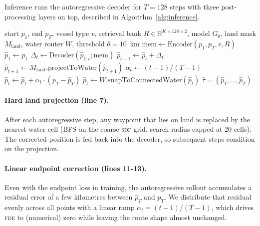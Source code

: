 \documentclass[oneside, a4paper, onecolumn, 11pt]{article}
\newcommand{\fde}{\textsc{fde}}
\newcommand{\sdf}{\textsc{sdf}}
\begin{document}
Inference runs the autoregressive decoder for $T = 128$ steps with
three post-processing layers on top, described in
Algorithm~\ref{alg:inference}.

\begin{algorithm}[h]
\caption{Inference: production routing.}
\label{alg:inference}
\begin{algorithmic}[1]
\REQUIRE start $p_1$, end $p_T$, vessel type $v$,
         retrieval bank $R \in \mathbb{R}^{K \times 128 \times 2}$,
         model $G_\theta$, land mask $M_{\mathrm{land}}$,
         water router $W$, threshold $\theta = 10$~km
\STATE $\mathrm{mem} \leftarrow \mathrm{Encoder}(p_1, p_T, v, R)$
\STATE $\hat p_1 \leftarrow p_1$
  \STATE $\Delta_t \leftarrow
          \mathrm{Decoder}(\hat p_{1:t}; \mathrm{mem})$
  \STATE $\hat p_{t+1} \leftarrow \hat p_t + \Delta_t$
    \STATE $\hat p_{t+1} \leftarrow
            M_{\mathrm{land}}.\mathrm{projectToWater}(\hat p_{t+1})$
  \ENDIF
\ENDFOR
\STATE {}
  \STATE $\alpha_t \leftarrow (t - 1) / (T - 1)$
  \STATE $\hat p_t \leftarrow \hat p_t + \alpha_t \cdot
                              (p_T - \hat p_T)$
\ENDFOR
\STATE {}
    \STATE $\hat p_t \leftarrow W.\mathrm{snapToConnectedWater}(\hat p_t)$
  \ENDIF
\ENDFOR
\RETURN $\hat \tau = (\hat p_1, \ldots, \hat p_T)$
\end{algorithmic}
\end{algorithm}

\paragraph{Hard land projection (line 7).}
After each autoregressive step, any waypoint that lies on land is
replaced by the nearest water cell (BFS on the coarse \sdf{} grid,
search radius capped at 20 cells).  The corrected position is fed back
into the decoder, so subsequent steps condition on the projection.

\paragraph{Linear endpoint correction (lines 11-13).}
Even with the endpoint loss in training, the autoregressive rollout
accumulates a residual error of a few kilometres between
$\hat p_T$ and $p_T$.  We distribute that residual evenly across all
points with a linear ramp $\alpha_t = (t-1) / (T-1)$, which drives \fde{}
to (numerical) zero while leaving the route shape almost unchanged.
\end{document}
